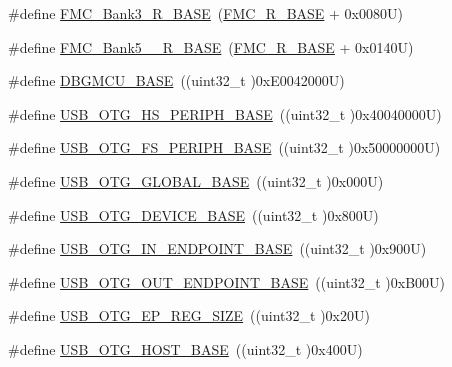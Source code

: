 \begin{DoxyCompactItemize}
\item 
\#define \hyperlink{group___peripheral__memory__map_gaf570671195a13f4bb2a1b8f2bd5305c9}{F\+M\+C\+\_\+\+Bank3\+\_\+\+R\+\_\+\+B\+A\+SE}~(\hyperlink{group___peripheral__memory__map_ga7a599164cd92798542bc6288793d1ed5}{F\+M\+C\+\_\+\+R\+\_\+\+B\+A\+SE} + 0x0080\+U)
\item 
\#define \hyperlink{group___peripheral__memory__map_gace117149a4fc0d07c38cc997fe4c4a73}{F\+M\+C\+\_\+\+Bank5\+\_\+\_\+\+R\+\_\+\+B\+A\+SE}~(\hyperlink{group___peripheral__memory__map_ga7a599164cd92798542bc6288793d1ed5}{F\+M\+C\+\_\+\+R\+\_\+\+B\+A\+SE} + 0x0140\+U)
\item 
\#define \hyperlink{group___peripheral__memory__map_ga4adaf4fd82ccc3a538f1f27a70cdbbef}{D\+B\+G\+M\+C\+U\+\_\+\+B\+A\+SE}~((uint32\+\_\+t )0x\+E0042000\+U)
\item 
\#define \hyperlink{group___peripheral__memory__map_gaa405d2ebfd7e9394237b6639f16a5409}{U\+S\+B\+\_\+\+O\+T\+G\+\_\+\+H\+S\+\_\+\+P\+E\+R\+I\+P\+H\+\_\+\+B\+A\+SE}~((uint32\+\_\+t )0x40040000\+U)
\item 
\#define \hyperlink{group___peripheral__memory__map_gaa86d4c80849a74938924e73937b904e7}{U\+S\+B\+\_\+\+O\+T\+G\+\_\+\+F\+S\+\_\+\+P\+E\+R\+I\+P\+H\+\_\+\+B\+A\+SE}~((uint32\+\_\+t )0x50000000\+U)
\item 
\#define \hyperlink{group___peripheral__memory__map_ga044aa4388e72d9d47a03f387fb8926fb}{U\+S\+B\+\_\+\+O\+T\+G\+\_\+\+G\+L\+O\+B\+A\+L\+\_\+\+B\+A\+SE}~((uint32\+\_\+t )0x000\+U)
\item 
\#define \hyperlink{group___peripheral__memory__map_ga4d74a337597a77b1fca978202b519a18}{U\+S\+B\+\_\+\+O\+T\+G\+\_\+\+D\+E\+V\+I\+C\+E\+\_\+\+B\+A\+SE}~((uint32\+\_\+t )0x800\+U)
\item 
\#define \hyperlink{group___peripheral__memory__map_gad8f69041452615aeb3948600e3882246}{U\+S\+B\+\_\+\+O\+T\+G\+\_\+\+I\+N\+\_\+\+E\+N\+D\+P\+O\+I\+N\+T\+\_\+\+B\+A\+SE}~((uint32\+\_\+t )0x900\+U)
\item 
\#define \hyperlink{group___peripheral__memory__map_gaf0e972b8f028ecf44a652029efbd4642}{U\+S\+B\+\_\+\+O\+T\+G\+\_\+\+O\+U\+T\+\_\+\+E\+N\+D\+P\+O\+I\+N\+T\+\_\+\+B\+A\+SE}~((uint32\+\_\+t )0x\+B00\+U)
\item 
\#define \hyperlink{group___peripheral__memory__map_ga6fdb7429ad88e2d69440d6ecc4f4199e}{U\+S\+B\+\_\+\+O\+T\+G\+\_\+\+E\+P\+\_\+\+R\+E\+G\+\_\+\+S\+I\+ZE}~((uint32\+\_\+t )0x20\+U)
\item 
\#define \hyperlink{group___peripheral__memory__map_ga3bb2dd6c82eefd8587b6146ba36ae071}{U\+S\+B\+\_\+\+O\+T\+G\+\_\+\+H\+O\+S\+T\+\_\+\+B\+A\+SE}~((uint32\+\_\+t )0x400\+U)

\end{DoxyCompactItemize}
